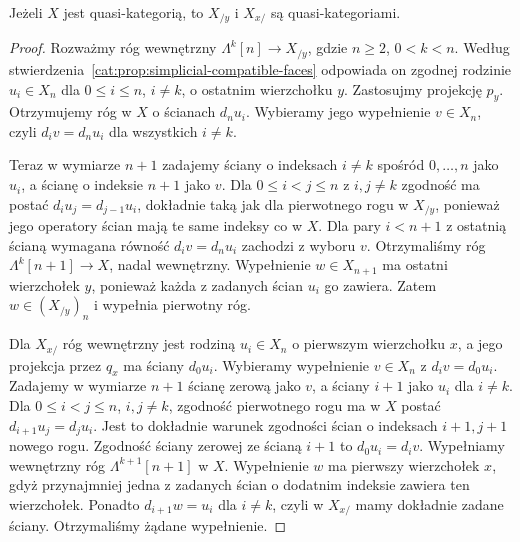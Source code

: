 \begin{stwierdzenie}\label{cat:prop:quasicat-slices-quasi}
Jeżeli $X$ jest quasi-kategorią, to $X_{/y}$ i $X_{x/}$ są quasi-kategoriami.
\end{stwierdzenie}
\begin{proof}
Rozważmy róg wewnętrzny $\Lambda^k[n]\to X_{/y}$, gdzie $n\geq2$, $0<k<n$. Według stwierdzenia~\ref{cat:prop:simplicial-compatible-faces} odpowiada on zgodnej rodzinie $u_i\in X_n$ dla $0\leq i\leq n$, $i\ne k$, o ostatnim wierzchołku $y$. Zastosujmy projekcję $p_y$. Otrzymujemy róg w $X$ o ścianach $d_nu_i$. Wybieramy jego wypełnienie $v\in X_n$, czyli $d_i v=d_n u_i$ dla wszystkich $i\ne k$.

Teraz w wymiarze $n+1$ zadajemy ściany o indeksach $i\ne k$ spośród $0,\ldots,n$ jako $u_i$, a ścianę o indeksie $n+1$ jako $v$. Dla $0\leq i<j\leq n$ z $i,j\ne k$ zgodność ma postać $d_i u_j=d_{j-1}u_i$, dokładnie taką jak dla pierwotnego rogu w $X_{/y}$, ponieważ jego operatory ścian mają te same indeksy co w $X$. Dla pary $i<n+1$ z ostatnią ścianą wymagana równość $d_iv=d_nu_i$ zachodzi z wyboru $v$. Otrzymaliśmy róg $\Lambda^k[n+1]\to X$, nadal wewnętrzny. Wypełnienie $w\in X_{n+1}$ ma ostatni wierzchołek $y$, ponieważ każda z zadanych ścian $u_i$ go zawiera. Zatem $w\in (X_{/y})_n$ i wypełnia pierwotny róg.

Dla $X_{x/}$ róg wewnętrzny jest rodziną $u_i\in X_n$ o pierwszym wierzchołku $x$, a jego projekcja przez $q_x$ ma ściany $d_0u_i$. Wybieramy wypełnienie $v\in X_n$ z $d_i v=d_0u_i$. Zadajemy w wymiarze $n+1$ ścianę zerową jako $v$, a ściany $i+1$ jako $u_i$ dla $i\ne k$. Dla $0\leq i<j\leq n$, $i,j\ne k$, zgodność pierwotnego rogu ma w $X$ postać $d_{i+1}u_j=d_j u_i$. Jest to dokładnie warunek zgodności ścian o indeksach $i+1,j+1$ nowego rogu. Zgodność ściany zerowej ze ścianą $i+1$ to $d_0u_i=d_iv$. Wypełniamy wewnętrzny róg $\Lambda^{k+1}[n+1]$ w $X$. Wypełnienie $w$ ma pierwszy wierzchołek $x$, gdyż przynajmniej jedna z zadanych ścian o dodatnim indeksie zawiera ten wierzchołek. Ponadto $d_{i+1}w=u_i$ dla $i\ne k$, czyli w $X_{x/}$ mamy dokładnie zadane ściany. Otrzymaliśmy żądane wypełnienie.
\end{proof}

